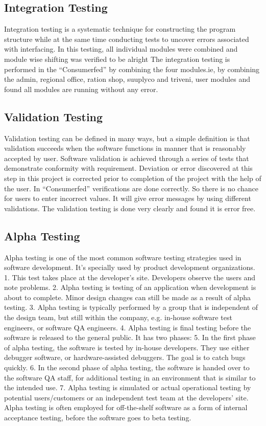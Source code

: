 \documentclass[a4paper,12pt]{article}
\begin{document}
\subsection{Integration Testing}  
\hspace{5mm}
 Integration testing is a systematic technique for constructing the program structure while at the same time conducting tests to uncover errors associated with interfacing. In this testing, all individual modules were combined and module wise shifting was verified to be alright
 The integration testing is performed in the “Consumerfed” by combining the four modules.ie, by combining the admin, regional office, ration shop, suuplyco and triveni, user modules and found all modules are running without any error.
\newpage
\subsection{Validation Testing}  
\hspace{5mm}  
 Validation testing can be defined in many ways, but a simple definition is that validation succeeds when the software functions in manner that is reasonably accepted by user. Software validation is achieved through a series of tests that demonstrate conformity with requirement. Deviation or error discovered at this step in this project is corrected prior to completion of the project with the help of the user. In “Consumerfed” verifications are done correctly. So there is no chance for users to enter incorrect values. It will give error messages by using different validations. The validation testing is done very clearly and found it is error free.
 \subsection{Alpha Testing}  
\hspace{5mm}  
    Alpha testing is one of the most common software testing strategies used in software development. It’s specially used by product development organizations.
1.	This test takes place at the developer’s site. Developers observe the users and note problems.
2.	Alpha testing is testing of an application when development is about to complete. Minor design changes can still be made as a result of alpha testing.
3.	Alpha testing is typically performed by a group that is independent of the design team, but still within the company, e.g. in-house software test engineers, or software QA engineers.
4.	Alpha testing is final testing before the software is released to the general public. It has two phases:
5.	In the first phase of alpha testing, the software is tested by in-house developers. They use either debugger software, or hardware-assisted debuggers. The goal is to catch bugs quickly.
6.	In the second phase of alpha testing, the software is handed over to the software QA staff, for additional testing in an environment that is similar to the intended use.
7.	Alpha testing is simulated or actual operational testing by potential users/customers or an independent test team at the developers’ site. Alpha testing is often employed for off-the-shelf software as a form of internal acceptance testing, before the software goes to beta testing. 
\newpage
\end{document}
